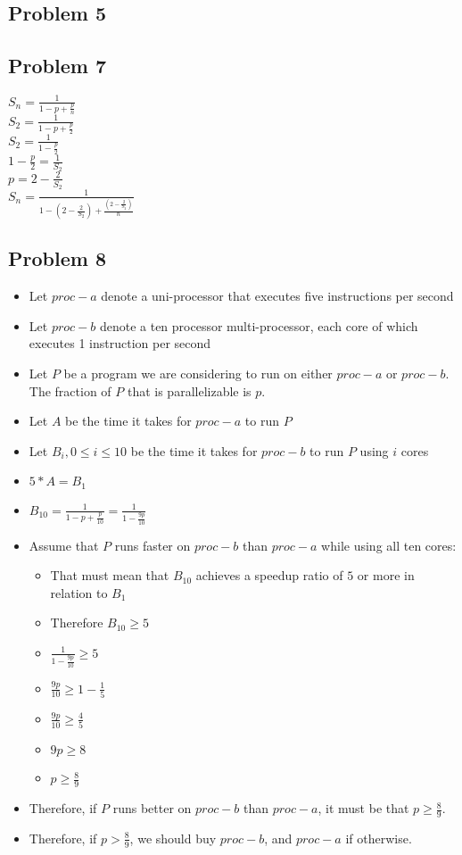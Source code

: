 \documentclass[]{article}
\begin{document}
\subsection{Problem 5}

\subsection{Problem 7}
$S_n = \frac{1}{1 - p + \frac{p}{n}}$ \\
$S_2 = \frac{1}{1 - p + \frac{p}{2}}$ \\
$S_2 = \frac{1}{1 - \frac{p}{2}}$ \\
$1 - \frac{p}{2} = \frac{1}{S_2}$ \\
$p = 2 - \frac{2}{S_2}$ \\
$S_n = \frac{1}{1 - (2 - \frac{2}{S_2}) + \frac{(2 - \frac{2}{S_2})}{n}}$\\

\subsection{Problem 8}
\begin{itemize}
	\item Let $proc-a$ denote a uni-processor that executes five instructions per second
	\item Let $proc-b$ denote a ten processor multi-processor, each core of which executes 1 instruction per second
	\item Let $P$ be a program we are considering to run on either $proc-a$ or $proc-b$. The fraction of $P$ that is parallelizable is $p$.
	\item Let $A$ be the time it takes for $proc-a$ to run $P$
	\item Let $B_i, 0 \leq i \leq 10$ be the time it takes for $proc-b$ to run $P$ using $i$ cores
	\item $5 * A = B_1$
	\item $B_{10} = \frac{1}{1 - p + \frac{p}{10}} = \frac{1}{1 - \frac{9p}{10}}$
	\item Assume that $P$ runs faster on $proc-b$ than $proc-a$ while using all ten cores:
	\begin{itemize}
		\item That must mean that $B_{10}$ achieves a speedup ratio of $5$ or more in relation to $B_1$
		\item Therefore $B_{10} \geq 5$
		\item $\frac{1}{1 - \frac{9p}{10}} \geq 5$
		\item $\frac{9p}{10} \geq 1 - \frac{1}{5}$
		\item $\frac{9p}{10} \geq \frac{4}{5}$
		\item $9p \geq 8$
		\item $p \geq \frac{8}{9}$
	\end{itemize}
	\item Therefore, if $P$ runs better on $proc-b$ than $proc-a$, it must be that  $p \geq \frac{8}{9}$. 
	\item Therefore, if $p > \frac{8}{9}$, we should buy $proc-b$, and $proc-a$ if otherwise.
	\end{itemize}
\end{document}
